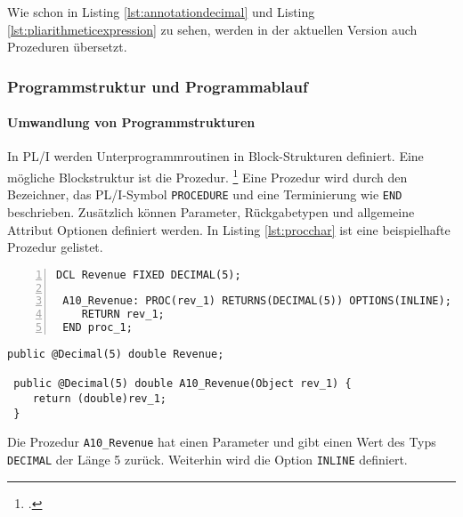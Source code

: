 Wie schon in Listing \ref{lst:annotationdecimal} und Listing \ref{lst:pliarithmeticexpression} zu sehen, werden in der aktuellen Version auch Prozeduren übersetzt.


\subsubsection{Programmstruktur und Programmablauf}
\paragraph*{Umwandlung von Programmstrukturen }\label{programstruct}

In PL/I werden Unterprogrammroutinen in Block-Strukturen definiert. Eine mögliche Blockstruktur ist die Prozedur. \footcite[Vgl. ][S. 97ff. ]{pliref}
Eine Prozedur wird durch den Bezeichner, das PL/I-Symbol \verb+PROCEDURE+ und eine Terminierung wie \verb+END+ beschrieben.
Zusätzlich können Parameter, Rückgabetypen und allgemeine Attribut Optionen definiert werden. In Listing \ref{lst:procchar} ist eine beispielhafte Prozedur gelistet.

\begin{minipage}[b]{0.48\linewidth}
	\centering
	\lstset{language=PL/I,label=SliceExaple}
	\begin{lstlisting}[frame=single, numbers=left, mathescape,%
		caption={Transformation einer Prozedur}, label={lst:procchar},
		basicstyle=\fontsize{9}{13}\selectfont\ttfamily]
 DCL Revenue FIXED DECIMAL(5);
		
 A10_Revenue: PROC(rev_1) RETURNS(DECIMAL(5)) OPTIONS(INLINE);
 	RETURN rev_1;
 END proc_1;
	\end{lstlisting}
\end{minipage}
\hspace{0.5cm}
\begin{minipage}[b]{0.48\linewidth}
	\centering
	\lstset{language=Java,label=SliceExaple}
	\begin{lstlisting}[frame=single, mathescape,%
		title={" "},
		basicstyle=\fontsize{9}{13}\selectfont\ttfamily]
 public @Decimal(5) double Revenue;		
		
 public @Decimal(5) double A10_Revenue(Object rev_1) { 
 	return (double)rev_1;
 }
	\end{lstlisting}
\end{minipage}

Die Prozedur \verb+A10_Revenue+ hat einen Parameter und gibt einen Wert des Typs \verb+DECIMAL+ der Länge 5 zurück.
Weiterhin wird die Option \verb+INLINE+ definiert.

